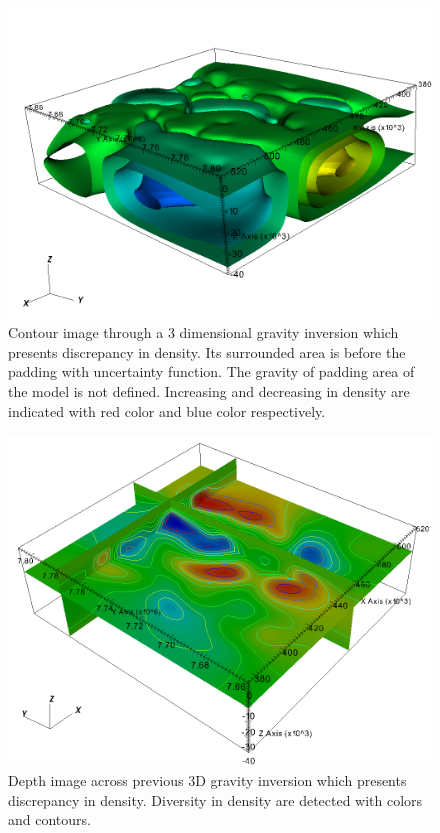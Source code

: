 \begin{figure}
\centering
\includegraphics[width=\textwidth]{density10.png}
\caption{Contour image through a 3 dimensional gravity inversion which presents discrepancy in density. Its surrounded area is before the padding with uncertainty function. The gravity of padding area of the
model is not defined. Increasing and decreasing in density are indicated with red color and blue color respectively.}
\end{figure}

\begin{figure}
\centering
\includegraphics[width=\textwidth]{density11.png}
\caption{Depth image across previous 3D gravity inversion which presents discrepancy in density. Diversity in density are detected with colors and contours.}
\end{figure}

